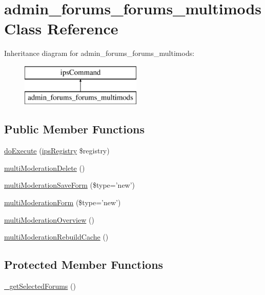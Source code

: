 \hypertarget{classadmin__forums__forums__multimods}{\section{admin\-\_\-forums\-\_\-forums\-\_\-multimods Class Reference}
\label{classadmin__forums__forums__multimods}
}
Inheritance diagram for admin\-\_\-forums\-\_\-forums\-\_\-multimods\-:\begin{figure}[H]
\begin{center}
\leavevmode
\includegraphics[height=2.000000cm]{classadmin__forums__forums__multimods}
\end{center}
\end{figure}
\subsection*{Public Member Functions}
\begin{DoxyCompactItemize}
\item 
\hyperlink{classadmin__forums__forums__multimods_afbc4e912a0604b94d47d66744c64d8ba}{do\-Execute} (\hyperlink{classips_registry}{ips\-Registry} \$registry)
\item 
\hyperlink{classadmin__forums__forums__multimods_ab1cf0bc64a2890606a82362c8adceeee}{multi\-Moderation\-Delete} ()
\item 
\hyperlink{classadmin__forums__forums__multimods_a0dcd4646ff71104de0b3bb598763067a}{multi\-Moderation\-Save\-Form} (\$type='new')
\item 
\hyperlink{classadmin__forums__forums__multimods_a473d971c00f2cc70adeaa1e3c639535d}{multi\-Moderation\-Form} (\$type='new')
\item 
\hyperlink{classadmin__forums__forums__multimods_a39bce55b1d555cdd920a362e1e283039}{multi\-Moderation\-Overview} ()
\item 
\hyperlink{classadmin__forums__forums__multimods_a7556d7df9c4e85eabdccf7763f8d411e}{multi\-Moderation\-Rebuild\-Cache} ()
\end{DoxyCompactItemize}
\subsection*{Protected Member Functions}
\begin{DoxyCompactItemize}
\item 
\hyperlink{classadmin__forums__forums__multimods_aef887adb915e63517ac320b5ca48946c}{\-\_\-get\-Selected\-Forums} ()
\end{DoxyCompactItemize}
